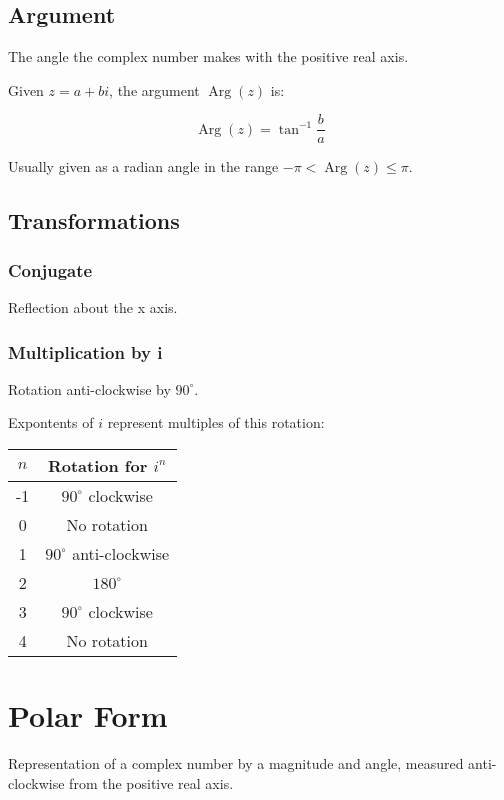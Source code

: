 \documentclass[a4paper,11pt]{article}
\DeclareMathOperator\Arg{Arg}
\begin{document}
\subsection{Argument}

The angle the complex number makes with the positive real axis.

Given $z = a + bi$, the argument $\Arg(z)$ is:

$$
\Arg(z) = \tan^{-1}{\frac{b}{a}}
$$

Usually given as a radian angle in the range $-\pi < \Arg(z) \leq \pi$.


\subsection{Transformations}

\subsubsection{Conjugate}

Reflection about the x axis.


\subsubsection{Multiplication by i}

Rotation anti-clockwise by $90^\circ$.

Expontents of $i$ represent multiples of this rotation:

\begin{center}
\begin{tabular}{c|c}
$n$ & Rotation for $i^n$ \\
\hline
-1 & $90^\circ$ clockwise \\
0 & No rotation \\
1 & $90^\circ$ anti-clockwise \\
2 & $180^\circ$ \\
3 & $90^\circ$ clockwise \\
4 & No rotation \\
\end{tabular}
\end{center}




\section{Polar Form}

Representation of a complex number by a magnitude and angle, measured
anti-clockwise from the positive real axis.
\end{document}
